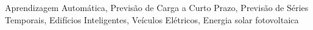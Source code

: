 \noindent Aprendizagem Automática, Previsão de Carga a Curto Prazo, Previsão de Séries Temporais, Edifícios Inteligentes, Veículos Elétricos, Energia solar fotovoltaica